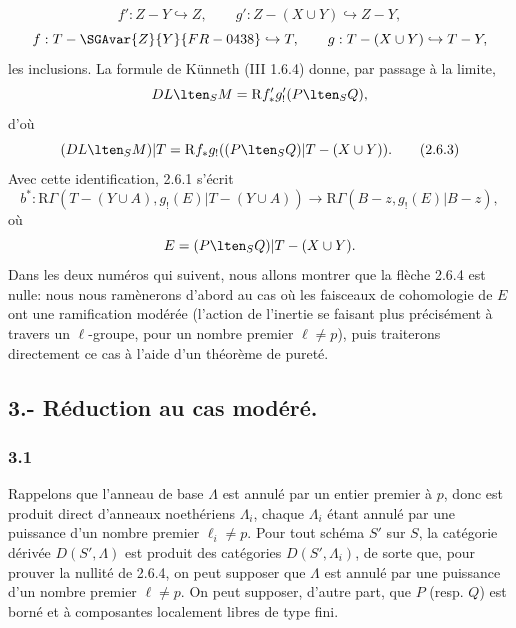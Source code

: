 \[
f':Z-Y\hookrightarrow Z,\qquad
g':Z-(X\cup Y)\hookrightarrow Z-Y,
\]
\[
f:T-\SGAvar{Z}{Y}{FR-0438}\hookrightarrow T,\qquad
g:T-(X\cup Y)\hookrightarrow T-Y,
\]
les inclusions. La formule de Künneth (III 1.6.4) donne, par passage à la limite,
\[
DL\lten_SM=\mathrm{R} f'_*g'_!(P\lten_SQ),
\]
d'où
\begin{equation}
(DL\lten_SM)|T=\mathrm{R} f_*g_!((P\lten_SQ)|T-(X\cup Y)).
\tag{2.6.3}
\end{equation}
Avec cette identification, 2.6.1 s'écrit
\begin{equation}
b^*:\mathrm{R}\Gamma(T-(Y\cup A),g_!(E)|T-(Y\cup A))
 \longrightarrow \mathrm{R}\Gamma(B-z,g_!(E)|B-z),
\tag{2.6.4}
\end{equation}
où
\[
E=(P\lten_SQ)|T-(X\cup Y).
\]
Dans les deux numéros qui suivent, nous allons montrer que la flèche 2.6.4 est nulle: nous nous ramènerons d'abord au cas où les faisceaux de cohomologie de $E$ ont une ramification modérée (l'action de l'inertie se faisant plus précisément à travers un $\ell$-groupe, pour un nombre premier $\ell\ne p$), puis traiterons directement ce cas à l'aide d'un théorème de pureté.

\subsection*{3.- Réduction au cas modéré.}

\subsubsection*{3.1}
Rappelons que l'anneau de base $\Lambda$ est annulé par un entier premier à $p$, donc est produit direct d'anneaux noethériens $\Lambda_i$, chaque $\Lambda_i$ étant annulé par une puissance d'un nombre premier $\ell_i\ne p$. Pour tout schéma $S'$ sur $S$, la catégorie dérivée $D(S',\Lambda)$ est produit des catégories $D(S',\Lambda_i)$, de sorte que, pour prouver la nullité de 2.6.4, on peut supposer que $\Lambda$ est annulé par une puissance d'un nombre premier $\ell\ne p$. On peut supposer, d'autre part, que $P$ (resp. $Q$) est borné et à composantes localement libres de type fini.

